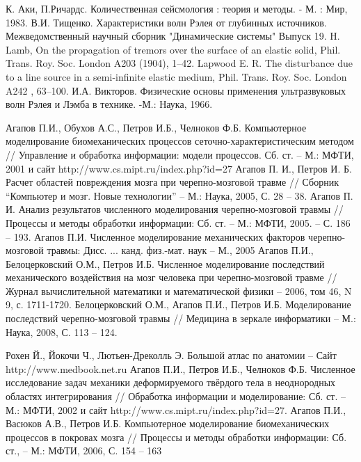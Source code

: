 \begin{thebibliography}{99}
К. Аки, П.Ричардс. Количественная сейсмология : теория и методы. - М. : Мир, 1983.
В.И. Тищенко. Характеристики волн Рэлея от глубинных источников. Межведомственный научный сборник "Динамические системы" Выпуск 19.
H. Lamb, On the propagation of tremors over the surface of an elastic solid, Phil. Trans. Roy. Soc. London A203 (1904), 1–42.
Lapwood E. R. The disturbance due to a line source in a semi-infinite elastic medium, Phil. Trans. Roy. Soc. London A242 , 63–100.
И.А. Викторов. Физические основы применения ультразвуковых волн Рэлея и Лэмба в технике. -М.: Наука, 1966.

 Агапов П.И., Обухов А.С., Петров И.Б., Челноков Ф.Б. Компьютерное моделирование биомеханических процессов сеточно-характеристическим методом // Управление и обработка информации: модели процессов. Сб. ст. – М.: МФТИ, 2001 и сайт http://www.cs.mipt.ru/index.php?id=27
 Агапов П. И., Петров И. Б. Расчет областей повреждения мозга при черепно-мозговой травме // Сборник “Компьютер и мозг. Новые технологии” – М.: Наука, 2005, С. 28 – 38.
 Агапов П. И. Анализ результатов численного моделирования черепно-мозговой травмы // Процессы и методы обработки информации: Сб. ст. – М.: МФТИ, 2005. – С. 186 – 193.
 Агапов П.И. Численное моделирование механических факторов черепно-мозговой травмы: Дисс. ... канд. физ.-мат. наук – М., 2005
Агапов П.И., Белоцерковский О.М., Петров И.Б. Численное моделирование последствий механического воздействия на мозг человека при черепно-мозговой травме // Журнал вычислительной математики и математической физики – 2006, том 46, N 9, с. 1711-1720.
 Белоцерковский О.М., Агапов П.И., Петров И.Б. Моделирование последствий черепно-мозговой травмы // Медицина в зеркале информатики – М.: Наука, 2008, С. 113 – 124.

 Рохен Й., Йокочи Ч., Лютьен-Дреколль Э. Большой атлас по анатомии – Сайт http://www.medbook.net.ru
 Агапов П.И., Петров И.Б., Челноков Ф.Б. Численное исследование задач механики деформируемого твёрдого тела в неоднородных областях интегрирования // Обработка информации и моделирование: Сб. ст. – М.: МФТИ, 2002 и сайт http://www.cs.mipt.ru/index.php?id=27.
 Агапов П.И., Васюков А.В., Петров И.Б. Компьютерное моделирование биомеханических процессов в покровах мозга // Процессы и методы обработки информации: Сб. ст., – М.: МФТИ, 2006, С. 154 – 163


\end{thebibliography}
